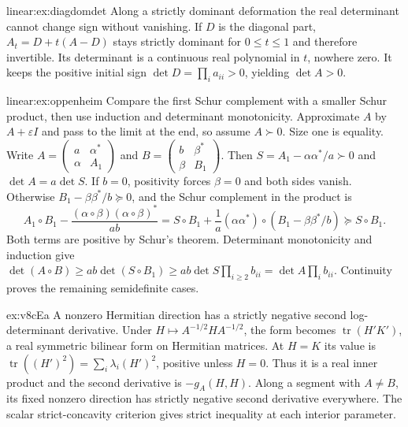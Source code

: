 \begin{solution}{linear:ex:diagdomdet}
\idea Along a strictly dominant deformation the real determinant cannot change sign without vanishing.
\writeup If $D$ is the diagonal part, $A_t=D+t(A-D)$ stays strictly dominant for $0\le t\le1$ and therefore invertible. Its determinant is a continuous real polynomial in $t$, nowhere zero. It keeps the positive initial sign $\det D=\prod_ia_{ii}>0$, yielding $\det A>0$.
\end{solution}
\begin{solution}{linear:ex:oppenheim}
\idea Compare the first Schur complement with a smaller Schur product, then use induction and determinant monotonicity.
\writeup Approximate $A$ by $A+\varepsilon I$ and pass to the limit at the end, so assume $A\succ0$. Size one is equality. Write $A=\begin{pmatrix}a&\alpha^*\\\alpha&A_1\end{pmatrix}$ and $B=\begin{pmatrix}b&\beta^*\\\beta&B_1\end{pmatrix}$. Then $S=A_1-\alpha\alpha^*/a\succ0$ and $\det A=a\det S$. If $b=0$, positivity forces $\beta=0$ and both sides vanish. Otherwise $B_1-\beta\beta^*/b\succeq0$, and the Schur complement in the product is
\[A_1\circ B_1-\frac{(\alpha\circ\beta)(\alpha\circ\beta)^*}{ab}
 =S\circ B_1+\frac1a(\alpha\alpha^*)\circ(B_1-\beta\beta^*/b)\succeq S\circ B_1.
\]
Both terms are positive by Schur's theorem. Determinant monotonicity and induction give $\det(A\circ B)\ge ab\det(S\circ B_1)\ge ab\det S\prod_{i\ge2}b_{ii}=\det A\prod_ib_{ii}$. Continuity proves the remaining semidefinite cases.
\end{solution}
\begin{solution}{ex:v8cEa}
\idea A nonzero Hermitian direction has a strictly negative second log-determinant derivative.
\writeup Under $H\mapsto A^{-1/2}HA^{-1/2}$, the form becomes $\operatorname{tr}(H'K')$, a real symmetric bilinear form on Hermitian matrices. At $H=K$ its value is $\operatorname{tr}((H')^2)=\sum_i\lambda_i(H')^2$, positive unless $H=0$. Thus it is a real inner product and the second derivative is $-g_A(H,H)$. Along a segment with $A\ne B$, its fixed nonzero direction has strictly negative second derivative everywhere. The scalar strict-concavity criterion gives strict inequality at each interior parameter.
\end{solution}
